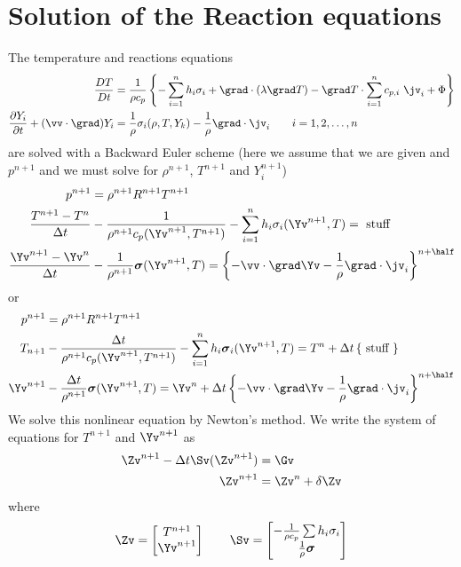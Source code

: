 \documentclass{article}
\begin{document}
\section{Solution of the Reaction equations}

\newcommand{\dt}{{\Delta t}}
\newcommand{\dY}{{\delta Y}}
\newcommand{\dT}{{\delta T}}

The temperature and reactions equations
\begin{align*}
  {D T\over Dt} & = 
       {1\over \rho c_p}  \left\{ -\sumi h_i\sigma_i + \grad\cdot(\lambda\grad T)
      - \grad T \cdot\sumi c_{p,i} ~ \jv_i
              + \Phi \right\} \\
  {\partial Y_i \over \partial t} + (\vv\cdot\grad) Y_i &= {1\over\rho}{\sigma_i(\rho,T,Y_k) }
               -{1\over\rho}\grad\cdot\jv_i \qquad i=1,2,\ldots,n
\end{align*}
are solved with a Backward Euler scheme (here we assume that we are given and $p^{n+1}$ and we must solve
for $\rho^{n+1}$, $T^{n+1}$ and $Y_i^{n+1}$)
\begin{align*}
  p^{n+1} & = \rho^{n+1} R^{n+1} T^{n+1} \\
  {T^{n+1}-T^n \over \dt} &- {1\over \rho^{n+1} c_p(\Yv^{n+1},T^{n+1})}  -\sumi h_i\sigma_i (\Yv^{n+1},T) =
             \mbox{ stuff }\\
  {\Yv^{n+1}-\Yv^n \over \dt} &- {1\over \rho^{n+1}} \sigmav(\Yv^{n+1},T) = \left\{ -\vv\cdot\grad \Yv 
                    -{1\over\rho}\grad\cdot\jv_i \right\}^{n+\half}
\end{align*}
or
\begin{align*}
  p^{n+1} & = \rho^{n+1} R^{n+1} T^{n+1} \\
  T_{n+1}  &- {\dt\over \rho^{n+1} c_p(\Yv^{n+1},T^{n+1})}  -\sumi h_i\sigmav_i (\Yv^{n+1},T) =
      T^n + \dt\left\{ \mbox{ stuff } \right\} \\ 
  \Yv^{n+1} & - {\dt \over \rho^{n+1}} \sigmav(\Yv^{n+1},T) = \Yv^n +\dt\left\{ -\vv\cdot\grad \Yv
        - {1\over\rho}\grad\cdot\jv_i \right\}^{n+\half}
\end{align*}
We solve this nonlinear equation by Newton's method. 
We write the system of equations for $T^{n+1}$ and $\Yv^{n+1}$ as
\begin{align*}
  \Zv^{n+1} - \dt \Sv(\Zv^{n+1}) & = \Gv \\
  \Zv^{n+1} &= \Zv^n + \delta\Zv
\end{align*}
where
\[
  \Zv = \begin{bmatrix} T^{n+1} \\ \Yv^{n+1} \end{bmatrix} \qquad
  \Sv = \begin{bmatrix} -{1\over \rho c_p}  \sum h_i\sigma_i \\
                         {1\over \rho} \sigmav \end{bmatrix}
\]
\end{document}

